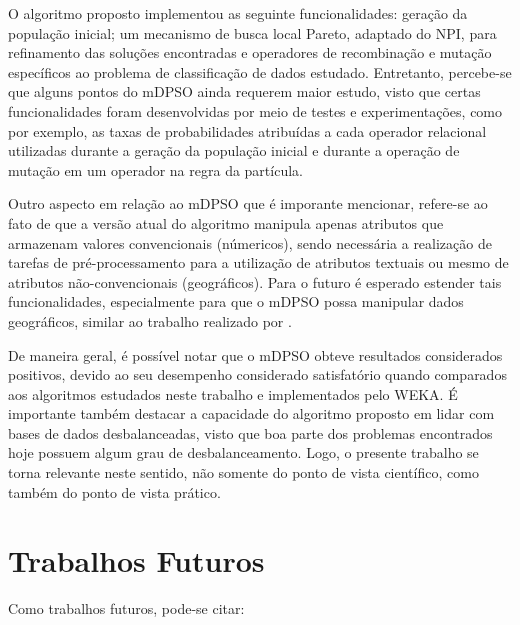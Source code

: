 \documentclass[
	12pt,				%
	openany,			%
	oneside,	
	a4paper,			%
	brazil,				%
	]{unimontes-ppgmsc-abntex2}
\begin{document}
O algoritmo proposto implementou as seguinte funcionalidades: geração da população inicial; um mecanismo de busca local Pareto, adaptado do NPI, para refinamento das soluções encontradas e operadores de recombinação e mutação específicos ao problema de classificação de dados estudado. Entretanto, percebe-se que alguns pontos do mDPSO ainda requerem maior estudo, visto que certas funcionalidades foram desenvolvidas por meio de testes e experimentações, como por exemplo, as taxas de probabilidades atribuídas a cada operador relacional utilizadas durante a geração da população inicial e durante a operação de mutação em um operador na regra da partícula. 

Outro aspecto em relação ao mDPSO que é imporante mencionar, refere-se ao fato de que a versão atual do algoritmo manipula apenas atributos que armazenam valores convencionais (númericos), sendo necessária a realização de tarefas de pré-processamento para a utilização de atributos textuais ou mesmo de atributos não-convencionais (geográficos). Para o futuro é esperado estender tais funcionalidades, especialmente para que o mDPSO possa manipular dados geográficos, similar ao trabalho realizado por .

De maneira geral, é possível notar que o mDPSO obteve resultados considerados positivos, devido ao seu desempenho considerado satisfatório quando comparados aos algoritmos estudados neste trabalho e implementados pelo WEKA. É importante também destacar a capacidade do algoritmo proposto em lidar com bases de dados desbalanceadas, visto que boa parte dos problemas encontrados hoje possuem algum grau de desbalanceamento. Logo, o presente trabalho se torna relevante neste sentido, não somente do ponto de vista científico, como também do ponto de vista prático.

\section{Trabalhos Futuros}

Como trabalhos futuros, pode-se citar:
\end{document}
